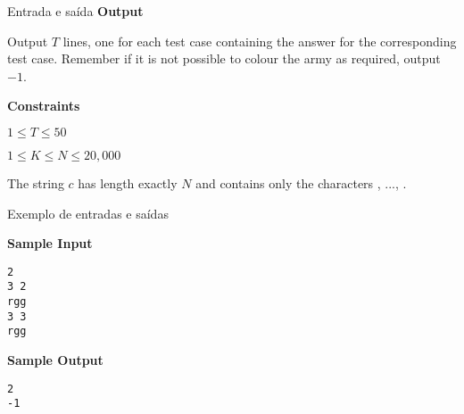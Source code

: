 \begin{frame}[fragile]{Entrada e saída}
\textbf{Output}

Output $T$ lines, one for each test case containing the answer for the corresponding test case. Remember if it is not possible to colour the army as required, output $-1$.

\textbf{Constraints}

$1 \leq T \leq 50$

$1 \leq K \leq N \leq 20,000$

The string $c$ has length exactly $N$ and contains only the characters , ...,
.
 
\end{frame}

\begin{frame}[fragile]{Exemplo de entradas e saídas}

\begin{minipage}[t]{0.5\textwidth}
\textbf{Sample Input}
\begin{verbatim}
2
3 2
rgg
3 3
rgg
\end{verbatim}
\end{minipage}
\begin{minipage}[t]{0.45\textwidth}
\textbf{Sample Output}
\begin{verbatim}
2
-1
\end{verbatim}
\end{minipage}
\end{frame}

